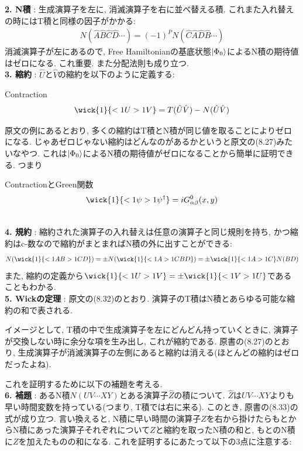 \documentclass[10.5pt,a4paper]{jreport}
\begin{document}
\textbf{2. N積} : 生成演算子を左に, 消滅演算子を右に並べ替える積. これまた入れ替えの時にはT積と同様の因子がかかる:
\begin{eqnarray}
  N(\hat{A}\hat{B}\hat{C}\hat{D}\cdots) = (-1)^PN(\hat{C}\hat{A}\hat{D}\hat{B}\cdots)
\end{eqnarray}
消滅演算子が左にあるので, Free Hamiltonianの基底状態$\ket{\Phi_0}$によるN積の期待値はゼロになる. これ重要. また分配法則も成り立つ. \\

\textbf{3. 縮約} : $\hat{U}$と$\hat{V}$の縮約を以下のように定義する:
\begin{itembox}[c]{Contraction}
  \begin{eqnarray}
    \wick{1}{<1U >1V} = T(\hat{U}\hat{V}) - N(\hat{U}\hat{V})\label{wick3}
  \end{eqnarray}
\end{itembox}
原文の例にあるとおり, 多くの縮約はT積とN積が同じ値を取ることによりゼロになる. じゃあゼロじゃない縮約はどんなのがあるかというと原文の(8.27)みたいなやつ. これは$\ket{\Phi_0}$によるN積の期待値がゼロになることから簡単に証明できる. つまり
\begin{itembox}[c]{ContractionとGreen関数}
  \begin{eqnarray}
    \wick{1}{<1\psi >1\psi^\dagger} = iG^0_{\alpha\beta}(x, y)\label{wick4}
\end{eqnarray}
\end{itembox}\\

\textbf{4. 規約} : 縮約された演算子の入れ替えは任意の演算子と同じ規則を持ち, かつ縮約はc-数なので縮約がまとまればN積の外に出すことができる:
\begin{eqnarray}
  N(\wick{1}{<1A B >1C D}) = \pm N(\wick{1}{<1A >1C B D}) = \pm \wick{1}{<1A >1C}N(BD)
\end{eqnarray}
また, 縮約の定義から$\wick{1}{<1U >1V} = \pm \wick{1}{<1V >1U}$であることもわかる. \\

\textbf{5. Wickの定理} : 原文の(8.32)のとおり. 演算子のT積はN積とあらゆる可能な縮約の和で表される.

イメージとして, T積の中で生成演算子を左にどんどん持っていくときに, 演算子が交換しない時に余分な項を生み出し, これが縮約である. 原書の(8.27)のとおり, 生成演算子が消滅演算子の左側にあると縮約は消える(ほとんどの縮約はゼロだったよね).

これを証明するために以下の補題を考える.\\

\textbf{6. 補題} : あるN積$N(UV\cdots XY)$とある演算子$\hat{Z}$の積について. $\hat{Z}$は$UV\cdots XY$よりも早い時間変数を持っている(つまり, T積では右に来る). このとき, 原書の(8.33)の式が成り立つ. 言い換えると, N積に早い時間の演算子$Z$を右から掛けたらもとからN積にあった演算子それぞれについて$Z$と縮約を取ったN積の和と, もとのN積に$Z$を加えたものの和になる. これを証明するにあたって以下の3点に注意する:\\
\end{document}
